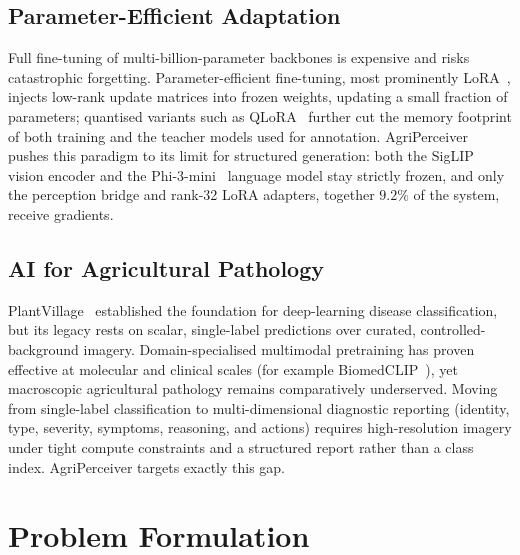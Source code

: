 \documentclass[runningheads]{llncs}
\newcommand{\ours}{AgriPerceiver}
\begin{document}
\subsection{Parameter-Efficient Adaptation}
Full fine-tuning of multi-billion-parameter backbones is expensive and risks catastrophic forgetting. Parameter-efficient fine-tuning, most prominently LoRA~\cite{hu2022lora}, injects low-rank update matrices into frozen weights, updating a small fraction of parameters; quantised variants such as QLoRA~\cite{dettmers2024qlora} further cut the memory footprint of both training and the teacher models used for annotation. \ours{} pushes this paradigm to its limit for structured generation: both the SigLIP~\cite{zhai2023sigmoid} vision encoder and the Phi-3-mini~\cite{abdin2024phi3} language model stay strictly frozen, and only the perception bridge and rank-32 LoRA adapters, together $9.2\%$ of the system, receive gradients.

\subsection{AI for Agricultural Pathology}
PlantVillage~\cite{mohanty2016using} established the foundation for deep-learning disease classification, but its legacy rests on scalar, single-label predictions over curated, controlled-background imagery. Domain-specialised multimodal pretraining has proven effective at molecular and clinical scales (for example BiomedCLIP~\cite{zhang2023biomedclip}), yet macroscopic agricultural pathology remains comparatively underserved. Moving from single-label classification to multi-dimensional diagnostic reporting (identity, type, severity, symptoms, reasoning, and actions) requires high-resolution imagery under tight compute constraints and a structured report rather than a class index. \ours{} targets exactly this gap.

\section{Problem Formulation}
\label{sec:problem}
\end{document}
